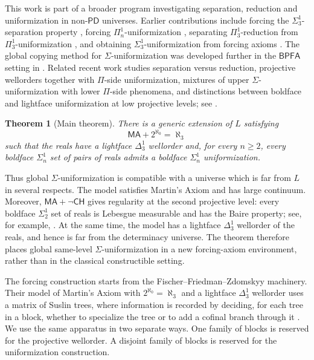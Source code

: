 \documentclass[11pt]{article}
\theoremstyle{plain}
\newtheorem{theorem}{Theorem}[section]
\theoremstyle{definition}
\theoremstyle{remark}
\newcommand{\MA}{\mathsf{MA}}
\newcommand{\BPFA}{\mathsf{BPFA}}
\newcommand{\CH}{\mathsf{CH}}
\begin{document}
This work is part of a broader program investigating separation, reduction and
uniformization in non-\(\mathsf{PD}\) universes.  Earlier contributions include
forcing the \(\Sigma^1_3\)-separation property
\cite{HoffelnerSeparation}, forcing \(\Pi^1_n\)-uniformization
\cite{HoffelnerPiUniformization}, separating \(\Pi^1_3\)-reduction from
\(\Pi^1_3\)-uniformization \cite{HoffelnerPiReduction}, and obtaining
\(\Sigma^1_3\)-uniformization from forcing axioms
\cite{HoffelnerForcingAxioms}.  The global copying method for
\(\Sigma\)-uniformization was developed further in the \(\BPFA\) setting in
\cite{BPFA_and_global_Sigma-uniformization}.  Related recent work studies
separation versus reduction, projective wellorders together with
\(\Pi\)-side uniformization, mixtures of upper \(\Sigma\)-uniformization with
lower \(\Pi\)-side phenomena, and distinctions between boldface and lightface
uniformization at low projective levels; see
\cite{HoffelnerSeparationReduction,HoffelnerCHPiUniformization,HoffelnerUpperSigma,HoffelnerSigma34}.

\begin{theorem}[Main theorem]
There is a generic extension of \(L\) satisfying
\[
\MA+2^{\aleph_0}=\aleph_3
\]
such that the reals have a lightface \(\Delta^1_3\) wellorder and, for every
\(n\geq 2\), every boldface \(\Sigma^1_n\) set of pairs of reals admits a
boldface \(\Sigma^1_n\) uniformization.
\end{theorem}

Thus global \(\Sigma\)-uniformization is compatible with a universe which is far
from \(L\) in several respects.  The model satisfies Martin's Axiom and has
large continuum.  Moreover, \(\MA+\neg\CH\) gives regularity at the second
projective level: every boldface \(\Sigma^1_2\) set of reals is Lebesgue
measurable and has the Baire property; see, for example, \cite{Fremlin,Kechris}.
At the same time, the model has a lightface \(\Delta^1_3\) wellorder of the
reals, and hence is far from the determinacy universe.  The theorem therefore
places global same-level \(\Sigma\)-uniformization in a new forcing-axiom
environment, rather than in the classical constructible setting.

The forcing construction starts from the Fischer--Friedman--Zdomskyy machinery.
Their model of Martin's Axiom with \(2^{\aleph_0}=\aleph_3\) and a lightface
\(\Delta^1_3\) wellorder uses a matrix of Suslin trees, where information is
recorded by deciding, for each tree in a block, whether to specialize the tree or
to add a cofinal branch through it \cite{FISCHER2013763}.  We use the same
apparatus in two separate ways.  One family of blocks is reserved for the
projective wellorder.  A disjoint family of blocks is reserved for the
uniformization construction.
\end{document}
